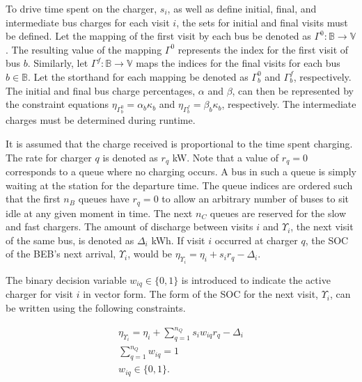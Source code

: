 \documentclass[ee,thesis]{usuthesis}
\begin{document}
To drive time spent on the charger, $s_i$, as well as define initial, final, and intermediate bus charges for each visit
$i$, the sets for initial and final visits must be defined. Let the mapping of the first visit by each bus be denoted as
$\Gamma^0 : \mathbb{B} \rightarrow \mathbb{V}$. The resulting value of the mapping $\Gamma^0$ represents the index for
the first visit of bus $b$. Similarly, let $\Gamma^f : \mathbb{B} \rightarrow \mathbb{V}$ maps the indices for the final
visits for each bus $b \in \mathbb{B}$. Let the storthand for each mapping be denoted as $\Gamma^0_b$ and $\Gamma^f_b$,
respectively. The initial and final bus charge percentages, $\alpha$ and $\beta$, can then be represented by the
constraint equations $\eta_{\Gamma^0_b} = \alpha_b \kappa_{b}$ and $\eta_{\Gamma^f_b} = \beta_b \kappa_{b}$,
respectively. The intermediate charges must be determined during runtime.

It is assumed that the charge received is proportional to the time spent charging. The rate for charger \(q\) is denoted
as \(r_q\) kW. Note that a value of \(r_q = 0\) corresponds to a queue where no charging occurs. A bus in such a queue is
simply waiting at the station for the departure time. The queue indices are ordered such that the first \(n_B\) queues
have \(r_q = 0\) to allow an arbitrary number of buses to sit idle at any given moment in time. The next \(n_C\) queues are
reserved for the slow and fast chargers. The amount of discharge between visits \(i\) and \(\Upsilon_i\), the next visit of the
same bus, is denoted as \(\Delta_i\) kWh. If visit \(i\) occurred at charger \(q\), the SOC of the BEB's next arrival, \(\Upsilon_i\), would
be \(\eta_{\Upsilon_i} = \eta_i + s_i r_q - \Delta_i\).

The binary decision variable \(w_{iq} \in \{0,1\}\) is introduced to indicate the active charger for visit \(i\) in vector
form. The form of the SOC for the next visit, \(\Upsilon_i\), can be written using the following constraints.

\begin{subequations}
    \label{subeq:pre_next_charge}
\begin{align}
    \eta_{\Upsilon_i} = \eta_i + \sum_{q=1}^{n_Q} s_i w_{iq} r_q - \Delta_i \\
    \sum_{q=1}^{n_Q} w_{iq} = 1                           \\
    w_{iq} \in \{0,1\}.
\end{align}
\end{subequations}
\end{document}
